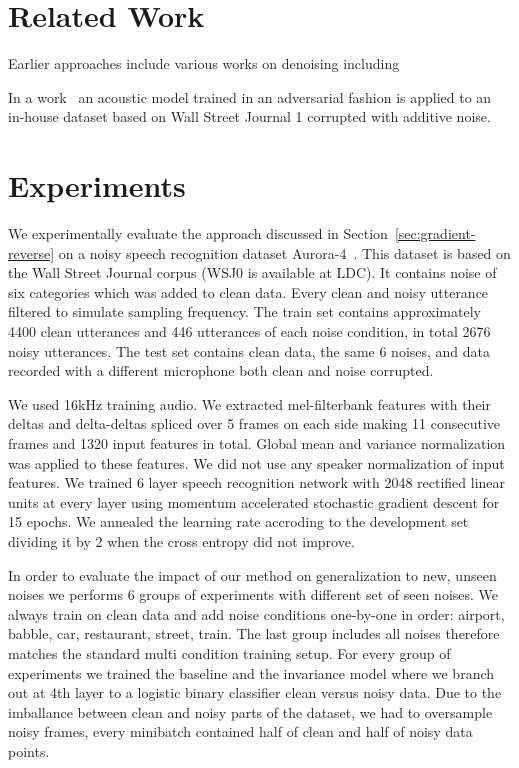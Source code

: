 \documentclass{article}
\begin{document}
\section{Related Work}
    Earlier approaches include various works on denoising including 

    In a work~\cite{yusuke2016adversarial} an acoustic model trained in an adversarial fashion is
    applied to an in-house dataset based on Wall Street Journal 1 corrupted with additive noise.
    

\section{Experiments}
\label{sec:experiments}
We experimentally evaluate the approach discussed in Section~\ref{sec:gradient-reverse} 
on a noisy speech recognition dataset Aurora-4~\cite{parihar2002aurora}. This dataset
is based on the Wall Street Journal corpus (WSJ0 is available at LDC). It contains noise of 
six categories which was added to clean
data. Every clean and noisy utterance filtered to simulate sampling frequency. The train
set contains approximately 4400 clean utterances and 446 utterances of each noise condition,
in total 2676 noisy utterances.
The test
set contains clean data, the same 6 noises, and data recorded with a different microphone
both clean and noise corrupted.

We used 16kHz training audio. We extracted mel-filterbank features with their deltas and 
delta-deltas spliced over 5 frames on each side making 11 consecutive frames and 1320 input 
features in total. Global mean and variance normalization was applied to these features.
We did not use any speaker normalization of input features. We trained 6 layer
speech recognition network with 2048 rectified linear units at every layer using momentum
accelerated stochastic gradient descent for 15 epochs. We annealed the learning rate accroding 
to the development set dividing it by 2 when the cross entropy did not improve.

In order to evaluate the impact of our method on generalization to new, unseen noises 
we performs 6 groups of experiments with different set of seen noises. We always train
on clean data and add noise conditions one-by-one in order: airport, babble, car, 
restaurant, street, train. The last group includes all noises therefore matches the
standard multi condition training setup. For every group of experiments we trained the
baseline and the invariance model where we branch out at 4th layer to a logistic 
binary classifier clean versus noisy data. Due to the imballance between clean and
noisy parts of the dataset, we had to oversample noisy frames, every minibatch contained
half of clean and half of noisy data points.
\end{document}
